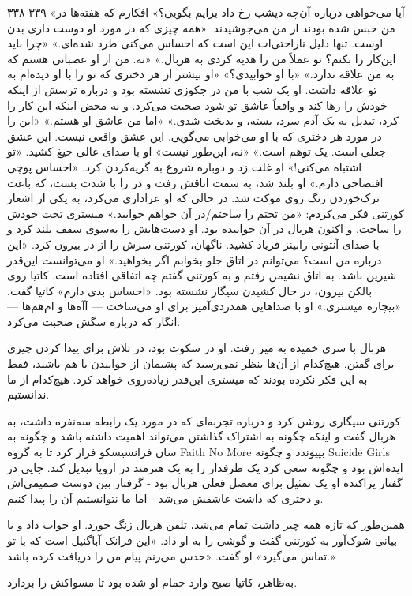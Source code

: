 ۳۳۸  
۳۳۹  
«آیا می‌خواهی درباره آن‌چه دیشب رخ داد برایم بگویی؟» افکارم که هفته‌ها در من حبس شده بودند از من می‌جوشیدند. «همه چیزی که در مورد او دوست داری بدن اوست. تنها دلیل ناراحتی‌ات این است که احساس می‌کنی طرد شده‌ای.»  
«چرا باید این‌کار را بکنم؟ تو عملاً من را هدیه کردی به هربال.»  
«نه. من از او عصبانی هستم که به من علاقه ندارد.» «با او خوابیدی؟»  
«او بیشتر از هر دختری که تو را با او دیده‌ام به تو علاقه داشت. او یک شب با من در جکوزی نشسته بود و درباره ترسش از اینکه خودش را رها کند و واقعاً عاشق تو شود صحبت می‌کرد. و به محض اینکه این کار را کرد، تبدیل به یک آدم سرد، بسته، و بدبخت شدی.»  
«اما من عاشق او هستم.»  
«این را در مورد هر دختری که با او می‌خوابی می‌گویی. این عشق واقعی نیست. این عشق جعلی است. یک توهم است.»  
«نه، این‌طور نیست» او با صدای عالی جیغ کشید. «تو اشتباه می‌کنی!»  
او غلت زد و دوباره شروع به گریه‌کردن کرد. «احساس پوچی افتضاحی دارم.»  
او بلند شد، به سمت اتاقش رفت و در را با شدت بست، که باعث ترک‌خوردن رنگ روی موکت شد. در حالی که او عزاداری می‌کرد، به یکی از اشعار کورتنی فکر می‌کردم: «من تختم را ساختم/در آن خواهم خوابید.» میستری تخت خودش را ساخت. و اکنون هربال در آن خوابیده بود.  
او دست‌هایش را به‌سوی سقف بلند کرد و با صدای آنتونی رابینز فریاد کشید. ناگهان، کورتنی سرش را از در بیرون کرد. «این درباره من است؟ می‌توانم در اتاق جلو بخوابم اگر بخواهید.»  
او می‌توانست این‌قدر شیرین باشد.  
به اتاق نشیمن رفتم و به کورتنی گفتم چه اتفاقی افتاده است. کاتیا روی بالکن بیرون، در حال کشیدن سیگار نشسته بود.  
«احساس بدی دارم» کاتیا گفت. «بیچاره میستری.» او با صداهایی همدردی‌آمیز برای او می‌ساخت — آآه‌ها و ام‌هم‌ها — انگار که درباره سگش صحبت می‌کرد. 

هربال با سری خمیده به میز رفت. او در سکوت بود، در تلاش برای پیدا کردن چیزی برای گفتن. هیچ‌کدام از آن‌ها بنظر نمی‌رسید که پشیمان از خوابیدن با هم باشند، فقط به این فکر نکرده بودند که میستری این‌قدر زیاده‌روی خواهد کرد. هیچ‌کدام از ما ندانستیم.

کورتنی سیگاری روشن کرد و درباره تجربه‌ای که در مورد یک رابطه سه‌نفره داشت، به هربال گفت و اینکه چگونه به اشتراک گذاشتن می‌تواند اهمیت داشته باشد و چگونه به سان فرانسیسکو فرار کرد تا به گروه Faith No More بپیوندد و چگونه Suicide Girls ایده‌اش بود و چگونه سعی کرد یک طرفدار را به یک هنرمند در اروپا تبدیل کند. جایی در گفتار پراکنده او یک تمثیل برای معضل فعلی هربال بود - گرفتار بین دوست صمیمی‌اش و دختری که داشت عاشقش می‌شد - اما ما نتوانستیم آن را پیدا کنیم.

همین‌طور که تازه همه چیز داشت تمام می‌شد، تلفن هربال زنگ خورد. او جواب داد و با بیانی شوک‌آور به کورتنی گفت و گوشی را به او داد.  
«این فرانک آباگنیل است که با تو تماس می‌گیرد» او گفت. «حدس می‌زنم پیام من را دریافت کرده باشد.»

به‌ظاهر، کاتیا صبح وارد حمام او شده بود تا مسواکش را بردارد.